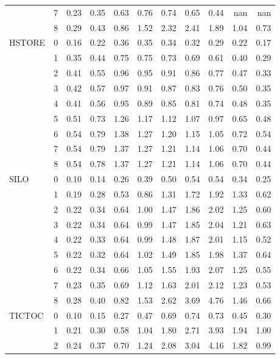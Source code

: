 \begin{tabular}{llrrrrrrrrr}
       & 7 & 0.23 & 0.35 & 0.63 & 0.76 & 0.74 & 0.65 & 0.44 &  nan &  nan \\
       & 8 & 0.29 & 0.43 & 0.86 & 1.52 & 2.32 & 2.41 & 1.89 & 1.04 & 0.73 \\
HSTORE & 0 & 0.16 & 0.22 & 0.36 & 0.35 & 0.34 & 0.32 & 0.29 & 0.22 & 0.17 \\
       & 1 & 0.35 & 0.44 & 0.75 & 0.75 & 0.73 & 0.69 & 0.61 & 0.40 & 0.29 \\
       & 2 & 0.41 & 0.55 & 0.96 & 0.95 & 0.91 & 0.86 & 0.77 & 0.47 & 0.33 \\
       & 3 & 0.42 & 0.57 & 0.97 & 0.91 & 0.87 & 0.83 & 0.76 & 0.50 & 0.35 \\
       & 4 & 0.41 & 0.56 & 0.95 & 0.89 & 0.85 & 0.81 & 0.74 & 0.48 & 0.35 \\
       & 5 & 0.51 & 0.73 & 1.26 & 1.17 & 1.12 & 1.07 & 0.97 & 0.65 & 0.48 \\
       & 6 & 0.54 & 0.79 & 1.38 & 1.27 & 1.20 & 1.15 & 1.05 & 0.72 & 0.54 \\
       & 7 & 0.54 & 0.79 & 1.37 & 1.27 & 1.21 & 1.14 & 1.06 & 0.70 & 0.44 \\
       & 8 & 0.54 & 0.78 & 1.37 & 1.27 & 1.21 & 1.14 & 1.06 & 0.70 & 0.44 \\
SILO & 0 & 0.10 & 0.14 & 0.26 & 0.39 & 0.50 & 0.54 & 0.54 & 0.34 & 0.25 \\
       & 1 & 0.19 & 0.28 & 0.53 & 0.86 & 1.31 & 1.72 & 1.92 & 1.33 & 0.62 \\
       & 2 & 0.22 & 0.34 & 0.64 & 1.00 & 1.47 & 1.86 & 2.02 & 1.25 & 0.60 \\
       & 3 & 0.22 & 0.34 & 0.64 & 0.99 & 1.47 & 1.85 & 2.04 & 1.21 & 0.63 \\
       & 4 & 0.22 & 0.33 & 0.64 & 0.99 & 1.48 & 1.87 & 2.01 & 1.15 & 0.52 \\
       & 5 & 0.22 & 0.32 & 0.64 & 1.02 & 1.49 & 1.85 & 1.98 & 1.37 & 0.64 \\
       & 6 & 0.22 & 0.34 & 0.66 & 1.05 & 1.55 & 1.93 & 2.07 & 1.25 & 0.55 \\
       & 7 & 0.23 & 0.35 & 0.69 & 1.12 & 1.63 & 2.01 & 2.12 & 1.23 & 0.53 \\
       & 8 & 0.28 & 0.40 & 0.82 & 1.53 & 2.62 & 3.69 & 4.76 & 1.46 & 0.66 \\
TICTOC & 0 & 0.10 & 0.15 & 0.27 & 0.47 & 0.69 & 0.74 & 0.73 & 0.45 & 0.30 \\
       & 1 & 0.21 & 0.30 & 0.58 & 1.04 & 1.80 & 2.71 & 3.93 & 1.94 & 1.00 \\
       & 2 & 0.24 & 0.37 & 0.70 & 1.24 & 2.08 & 3.04 & 4.16 & 1.82 & 0.99 \\

\end{tabular}

